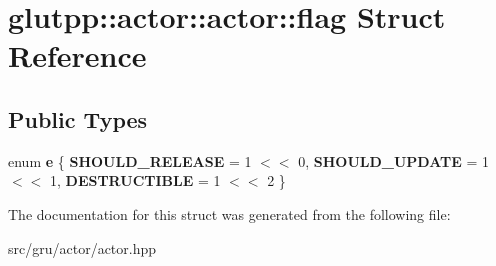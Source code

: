 \hypertarget{structglutpp_1_1actor_1_1actor_1_1flag}{\section{glutpp\-:\-:actor\-:\-:actor\-:\-:flag \-Struct \-Reference}
\label{structglutpp_1_1actor_1_1actor_1_1flag}
}
\subsection*{\-Public \-Types}
\begin{DoxyCompactItemize}
\item 
enum {\bfseries e} \{ {\bfseries \-S\-H\-O\-U\-L\-D\-\_\-\-R\-E\-L\-E\-A\-S\-E} =  1 $<$$<$ 0, 
{\bfseries \-S\-H\-O\-U\-L\-D\-\_\-\-U\-P\-D\-A\-T\-E} =  1 $<$$<$ 1, 
{\bfseries \-D\-E\-S\-T\-R\-U\-C\-T\-I\-B\-L\-E} =  1 $<$$<$ 2
 \}
\end{DoxyCompactItemize}


\-The documentation for this struct was generated from the following file\-:\begin{DoxyCompactItemize}
\item 
src/gru/actor/actor.\-hpp\end{DoxyCompactItemize}
